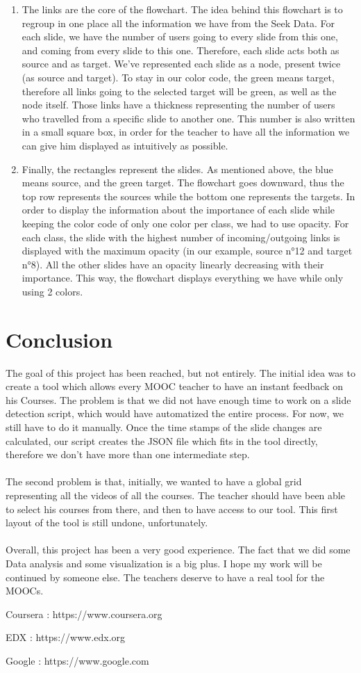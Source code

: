 \documentclass[11pt,a4paper]{article}
\begin{document}
\begin{enumerate}
    \item The links are the core of the flowchart. The idea behind this flowchart is to regroup in one place all the information we have from the Seek Data. For each slide, we have the number of users going to every slide from this one, and coming from every slide to this one. Therefore, each slide acts both as source and as target. We've represented each slide as a node, present twice (as source and target). To stay in our color code, the green means target, therefore all links going to the selected target will be green, as well as the node itself. Those links have a thickness representing the number of users who travelled from a specific slide to another one. This number is also written in a small square box, in order for the teacher to have all the information we can give him displayed as intuitively as possible.
    \item Finally, the rectangles represent the slides. As mentioned above, the blue means source, and the green target. The flowchart goes downward, thus the top row represents the sources while the bottom one represents the targets. In order to display the information about the importance of each slide while keeping the color code of only one color per class, we had to use opacity. For each class, the slide with the highest number of incoming/outgoing links is displayed with the maximum opacity (in our example, source n°12 and target n°8). All the other slides have an opacity linearly decreasing with their importance. This way, the flowchart displays everything we have while only using 2 colors. 
\end{enumerate}

\section{Conclusion}

The goal of this project has been reached, but not entirely. The initial idea was to create a tool which allows every MOOC teacher to have an instant feedback on his Courses. The problem is that we did not have enough time to work on a slide detection script, which would have automatized the entire process. For now, we still have to do it manually. Once the time stamps of the slide changes are calculated, our script creates the JSON file which fits in the tool directly, therefore we don't have more than one intermediate step. \\
\\
The second problem is that, initially, we wanted to have a global grid representing all the videos of all the courses. The teacher should have been able to select his courses from there, and then to have access to our tool. This first layout of the tool is still undone, unfortunately.\\
\\
Overall, this project has been a very good experience. The fact that we did some Data analysis and some visualization is a big plus. I hope my work will be continued by someone else. The teachers deserve to have a real tool for the MOOCs. 

\begin{thebibliography}{1}

Coursera : https://www.coursera.org

EDX : https://www.edx.org

Google : https://www.google.com
\end{thebibliography}
\end{document}
